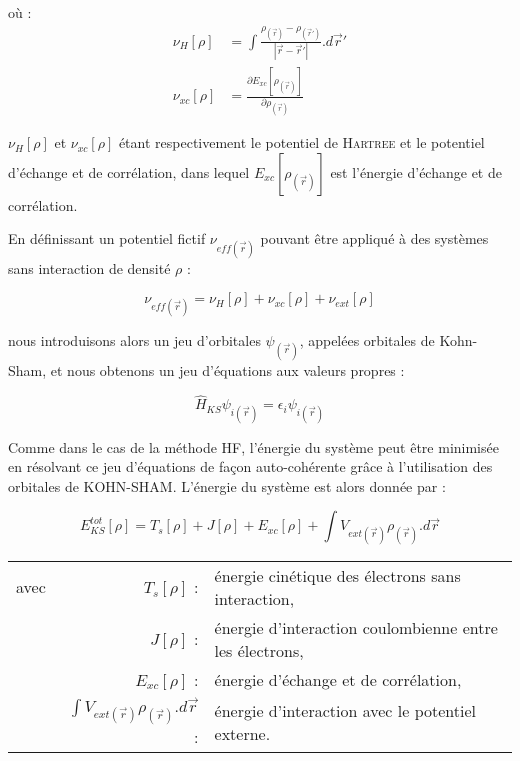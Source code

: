 \noindent où :
\begin{align}
\nu_{H}[\rho] &= \int \frac{\rho_{(\vec{r})} - \rho_{(\vec{r}')}}{|\vec{r} - \vec{r}'|} .d\vec{r}' \\
\nu_{xc}[\rho] &= \frac{\partial E_{xc}[\rho_{(\vec{r})}]}{\partial\rho_{(\vec{r})}}
\end{align}

\noindent $\nu_{H}[\rho]$ et $\nu_{xc}[\rho]$ étant respectivement le potentiel de \textsc{Hartree} et le potentiel d'échange et de corrélation, dans lequel $E_{xc}[\rho_{(\vec{r})}]$ est l'énergie d'échange et de corrélation.

En définissant un potentiel fictif $\nu_{eff(\vec{r})}$ pouvant être appliqué à des systèmes sans interaction de densité $\rho$ :

\begin{equation}
\nu_{eff(\vec{r})} = \nu_{H}[\rho] + \nu_{xc}[\rho] + \nu_{ext}[\rho]
\end{equation}

\noindent nous introduisons alors un jeu d'orbitales $\psi_{(\vec{r})}$, appelées orbitales de Kohn-Sham, et nous obtenons un jeu d'équations aux valeurs propres :

\begin{equation}
\hat{H}_{KS} \psi_{i(\vec{r})} = \epsilon_{i} \psi_{i(\vec{r})}
\end{equation}

Comme dans le cas de la méthode HF, l'énergie du système peut être minimisée en résolvant ce jeu d'équations de façon auto-cohérente grâce à l'utilisation des orbitales de KOHN-SHAM. L'énergie du système est alors donnée par :

\begin{equation}
E_{KS}^{tot}[\rho] = T_{s}[\rho] + J[\rho] + E_{xc}[\rho] + \int V_{ext(\vec{r})}\rho_{(\vec{r})} .d\vec{r}
\end{equation}

\begin{flushleft}
\begin{tabular}{@{}lrp{10cm}}
avec & $T_{s}[\rho]$ : & énergie cinétique des électrons sans interaction, \\
& $J[\rho]$ : & énergie d'interaction coulombienne entre les électrons, \\
& $E_{xc}[\rho]$ : & énergie d'échange et de corrélation, \\
& $\int V_{ext(\vec{r})}\rho_{(\vec{r})} .d\vec{r}$ : & énergie d'interaction avec le potentiel externe. 
\end{tabular}
\end{flushleft}

